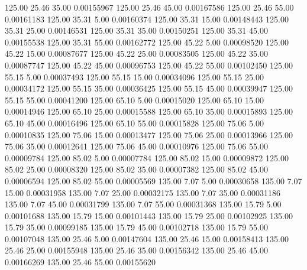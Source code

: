     125.00     25.46     35.00     0.00155967
    125.00     25.46     45.00     0.00167586
    125.00     25.46     55.00     0.00161183
    125.00     35.31      5.00     0.00160374
    125.00     35.31     15.00     0.00148443
    125.00     35.31     25.00     0.00146531
    125.00     35.31     35.00     0.00150251
    125.00     35.31     45.00     0.00155538
    125.00     35.31     55.00     0.00162772
    125.00     45.22      5.00     0.00098520
    125.00     45.22     15.00     0.00087677
    125.00     45.22     25.00     0.00083505
    125.00     45.22     35.00     0.00087747
    125.00     45.22     45.00     0.00096753
    125.00     45.22     55.00     0.00102450
    125.00     55.15      5.00     0.00037493
    125.00     55.15     15.00     0.00034096
    125.00     55.15     25.00     0.00034172
    125.00     55.15     35.00     0.00036425
    125.00     55.15     45.00     0.00039947
    125.00     55.15     55.00     0.00041200
    125.00     65.10      5.00     0.00015020
    125.00     65.10     15.00     0.00014946
    125.00     65.10     25.00     0.00015588
    125.00     65.10     35.00     0.00015893
    125.00     65.10     45.00     0.00016496
    125.00     65.10     55.00     0.00015828
    125.00     75.06      5.00     0.00010835
    125.00     75.06     15.00     0.00013477
    125.00     75.06     25.00     0.00013966
    125.00     75.06     35.00     0.00012641
    125.00     75.06     45.00     0.00010976
    125.00     75.06     55.00     0.00009784
    125.00     85.02      5.00     0.00007784
    125.00     85.02     15.00     0.00009872
    125.00     85.02     25.00     0.00008320
    125.00     85.02     35.00     0.00007382
    125.00     85.02     45.00     0.00006594
    125.00     85.02     55.00     0.00005569
    135.00      7.07      5.00     0.00030658
    135.00      7.07     15.00     0.00031958
    135.00      7.07     25.00     0.00032175
    135.00      7.07     35.00     0.00031186
    135.00      7.07     45.00     0.00031799
    135.00      7.07     55.00     0.00031368
    135.00     15.79      5.00     0.00101688
    135.00     15.79     15.00     0.00101443
    135.00     15.79     25.00     0.00102925
    135.00     15.79     35.00     0.00099185
    135.00     15.79     45.00     0.00102718
    135.00     15.79     55.00     0.00107048
    135.00     25.46      5.00     0.00147604
    135.00     25.46     15.00     0.00158413
    135.00     25.46     25.00     0.00155948
    135.00     25.46     35.00     0.00156342
    135.00     25.46     45.00     0.00166269
    135.00     25.46     55.00     0.00155620
